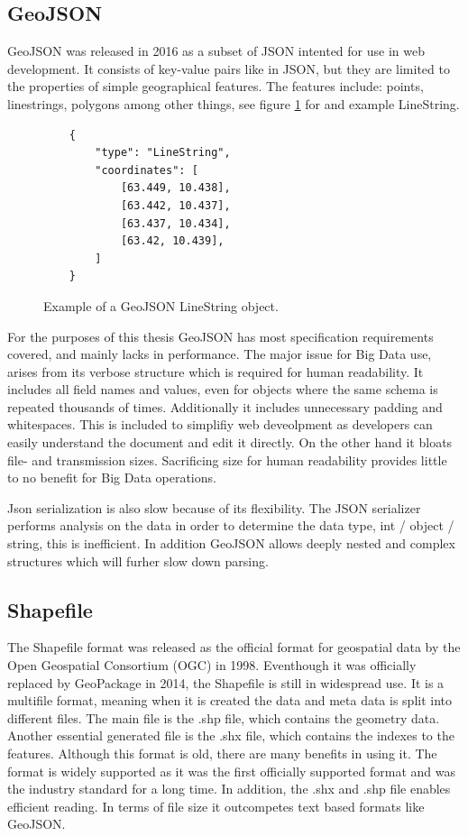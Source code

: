 \subsection{GeoJSON}
GeoJSON was released in 2016 as a subset of JSON intented for use in web development. It consists of key-value pairs like in JSON, but they are limited to the properties of simple geographical features. The features include: points, linestrings, polygons among other things, see figure \ref{fig:geojson} for and example LineString.

\begin{figure}[h]
    \begin{verbatim}
    {
        "type": "LineString", 
        "coordinates": [
            [63.449, 10.438],
            [63.442, 10.437],
            [63.437, 10.434],
            [63.42, 10.439],
        ]
    }
\end{verbatim}
    \caption{Example of a GeoJSON LineString object.}
    \label{fig:geojson}
\end{figure}
For the purposes of this thesis GeoJSON has most specification requirements covered, and mainly lacks in performance. The major issue for Big Data use, arises from its verbose structure which is required for human readability. It includes all field names and values, even for objects where the same schema is repeated thousands of times. Additionally it includes unnecessary padding and whitespaces. This is included to simplifiy web deveolpment as developers can easily understand the document and edit it directly. On the other hand it bloats file- and transmission sizes. Sacrificing size for human readability provides little to no benefit for Big Data operations.

Json serialization is also slow because of its flexibility. The JSON serializer performs analysis on the data in order to determine the data type, int / object / string, this is inefficient. In addition GeoJSON allows deeply nested and complex structures which will furher slow down parsing.

\subsection{Shapefile}
The Shapefile format was released as the official format for geospatial data by the Open Geospatial Consortium (OGC) in 1998. Eventhough it was officially replaced by GeoPackage in 2014, the Shapefile is still in widespread use. It is a multifile format, meaning when it is created the data and meta data is split into different files. The main file is the .shp file, which contains the geometry data. Another essential generated file is the .shx file, which contains the indexes to the features. Although this format is old, there are many benefits in using it. The format is widely supported as it was the first officially supported format and was the industry standard for a long time. In addition, the .shx and .shp file enables efficient reading. In terms of file size it outcompetes text based formats like GeoJSON.

